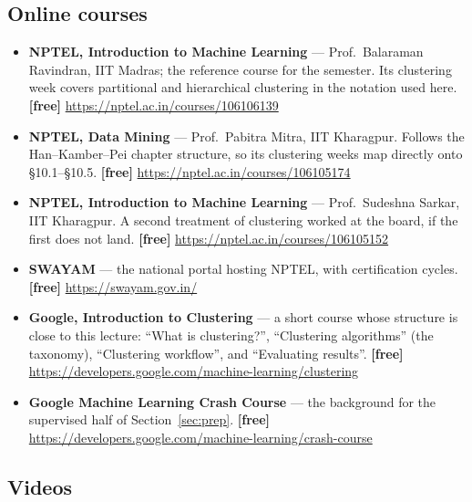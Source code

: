 \documentclass[11pt]{article}
\begin{document}
\subsection*{Online courses}

\begin{sloppypar}
\begin{itemize}[leftmargin=*]
  \item \textbf{NPTEL, Introduction to Machine Learning} --- Prof.\ Balaraman
    Ravindran, IIT Madras; the reference course for the semester. Its
    clustering week covers partitional and hierarchical clustering in the
    notation used here. \textbf{[free]}
    \url{https://nptel.ac.in/courses/106106139}
  \item \textbf{NPTEL, Data Mining} --- Prof.\ Pabitra Mitra, IIT Kharagpur.
    Follows the Han--Kamber--Pei chapter structure, so its clustering weeks
    map directly onto \S10.1--\S10.5. \textbf{[free]}
    \url{https://nptel.ac.in/courses/106105174}
  \item \textbf{NPTEL, Introduction to Machine Learning} --- Prof.\ Sudeshna
    Sarkar, IIT Kharagpur. A second treatment of clustering worked at the
    board, if the first does not land. \textbf{[free]}
    \url{https://nptel.ac.in/courses/106105152}
  \item \textbf{SWAYAM} --- the national portal hosting NPTEL, with
    certification cycles. \textbf{[free]} \url{https://swayam.gov.in/}
  \item \textbf{Google, Introduction to Clustering} --- a short course whose
    structure is close to this lecture: ``What is clustering?'', ``Clustering
    algorithms'' (the taxonomy), ``Clustering workflow'', and ``Evaluating
    results''. \textbf{[free]}
    \url{https://developers.google.com/machine-learning/clustering}
  \item \textbf{Google Machine Learning Crash Course} --- the background for
    the supervised half of Section~\ref{sec:prep}. \textbf{[free]}
    \url{https://developers.google.com/machine-learning/crash-course}
\end{itemize}
\end{sloppypar}

\subsection*{Videos}
\end{document}
